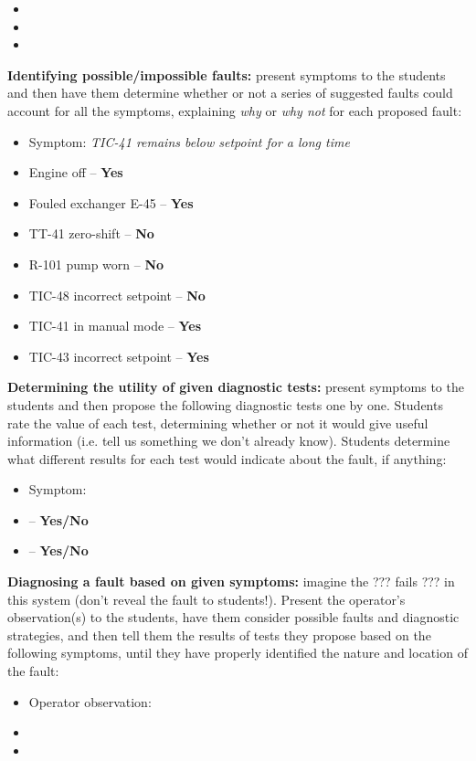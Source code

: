 \begin{itemize}
\item{} 
\item{} 
\item{} 
\end{itemize}


\vskip 10pt


\noindent
{\bf Identifying possible/impossible faults:} present symptoms to the students and then have them determine whether or not a series of suggested faults could account for all the symptoms, explaining {\it why} or {\it why not} for each proposed fault:

\begin{itemize}
\item{} Symptom: {\it TIC-41 remains below setpoint for a long time}
\item{} Engine off -- {\bf Yes}
\item{} Fouled exchanger E-45 -- {\bf Yes}
\item{} TT-41 zero-shift -- {\bf No}
\item{} R-101 pump worn -- {\bf No}
\item{} TIC-48 incorrect setpoint -- {\bf No}
\item{} TIC-41 in manual mode -- {\bf Yes}
\item{} TIC-43 incorrect setpoint -- {\bf Yes}
\end{itemize}


\vskip 10pt


\noindent
{\bf Determining the utility of given diagnostic tests:} present symptoms to the students and then propose the following diagnostic tests one by one.  Students rate the value of each test, determining whether or not it would give useful information (i.e. tell us something we don't already know).  Students determine what different results for each test would indicate about the fault, if anything:

\begin{itemize}
\item{} Symptom: {\it }
\item{}  -- {\bf Yes/No}
\item{}  -- {\bf Yes/No}
\end{itemize}


\vskip 10pt


\noindent
{\bf Diagnosing a fault based on given symptoms:} imagine the ??? fails ??? in this system (don't reveal the fault to students!).  Present the operator's observation(s) to the students, have them consider possible faults and diagnostic strategies, and then tell them the results of tests they propose based on the following symptoms, until they have properly identified the nature and location of the fault:

\begin{itemize}
\item{} Operator observation: {\it }
\item{} 
\item{} 
\end{itemize}



